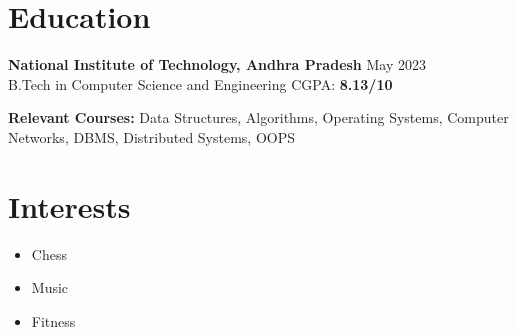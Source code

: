 \documentclass[a4paper,10pt]{article}
\newcommand{\resumeItem}[1]{\item\small{#1}}
\begin{document}
\section*{Education}
\textbf{National Institute of Technology, Andhra Pradesh} \hfill May 2023\\
B.Tech in Computer Science and Engineering \hfill CGPA: \textbf{8.13/10}\\
\vspace{4pt}

\textbf{Relevant Courses:} Data Structures, Algorithms, Operating Systems, Computer Networks, DBMS, Distributed Systems, OOPS

\section*{Interests}
\begin{itemize}[leftmargin=*,itemsep=2pt]
\resumeItem{Chess}
\resumeItem{Music}
\resumeItem{Fitness}
\end{itemize}
\end{document}

